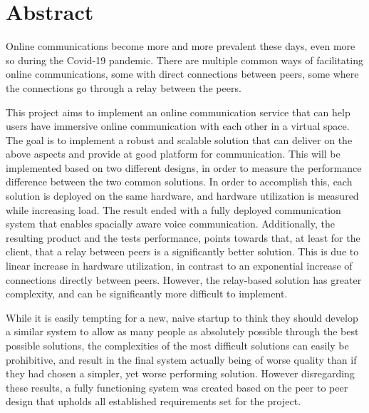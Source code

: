 \section*{Abstract}

\blindtext

Online communications become more and more prevalent these days, even more so during the Covid-19 pandemic. There are multiple common ways of facilitating online communications, some with direct connections between peers, some where the connections go through a relay between the peers.

This project aims to implement an online communication service that can help users have immersive online communication with each other in a virtual space. The goal is to implement a robust and scalable solution that can deliver on the above aspects and provide at good platform for communication. This will be implemented based on two different designs, in order to measure the performance difference between the two common solutions. In order to accomplish this, each solution is deployed on the same hardware, and hardware utilization is measured while increasing load. The result ended with a fully deployed communication system that enables spacially aware voice communication. Additionally, the resulting product and the tests performance, points towards that, at least for the client, that a relay between peers is a significantly better solution. This is due to linear increase in hardware utilization, in contrast to an exponential increase of connections directly between peers. However, the relay-based solution has greater complexity, and can be significantly more difficult to implement.

While it is easily tempting for a new, naive startup to think they should develop a similar system to allow as many people as absolutely possible through the best possible solutions, the complexities of the most difficult solutions can easily be prohibitive, and result in the final system actually being of worse quality than if they had chosen a simpler, yet worse performing solution. However disregarding these results, a fully functioning system was created based on the peer to peer design that upholds all established requirements set for the project. 